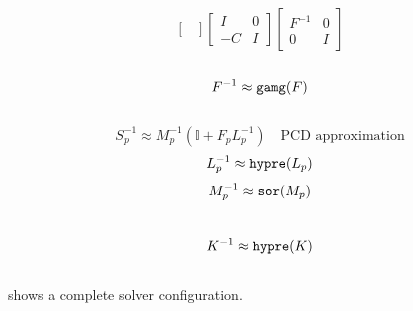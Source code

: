 \documentclass[presentation,aspectratio=43]{beamer}
\begin{document}
\begin{frame}[fragile,t]
\begin{columns}[t]
\begin{column}{0.49\textwidth}
{\begin{equation*}
\begin{bmatrix}
          \end{bmatrix}
          \begin{bmatrix}
            I & 0\\
            -C & I
          \end{bmatrix}
          \begin{bmatrix}
            F^{-1} & 0 \\
            0 & I
          \end{bmatrix}
        \end{equation*}
        \\[0.5\baselineskip]
        \begin{equation*}
          F^{-1} \approx \text{\texttt{gamg}}(F)
        \end{equation*}
        \\[1.25\baselineskip]
        \begin{equation*}
          S_p^{-1} \approx M_p^{-1}(\mathbb{I} + F_p L_p^{-1})\quad\text{PCD approximation}
        \end{equation*}
        \vspace{-1\baselineskip}
        \begin{equation*}
          L_p^{-1} \approx \text{\texttt{hypre}}(L_p)
        \end{equation*}
        \vspace{-1\baselineskip}
        \begin{equation*}
          M_p^{-1} \approx \text{\texttt{sor}}(M_p)
        \end{equation*}
        \\[0.4\baselineskip]
        \begin{equation*}
          K^{-1} \approx \text{\texttt{hypre}}(K)
        \end{equation*}
      }
    \end{column}
  \end{columns}
  \vspace{-\baselineskip}
  {\scriptsize \textcite[\S B.4]{Kirby:2018} shows a complete solver configuration.}
\end{frame}
\end{document}
